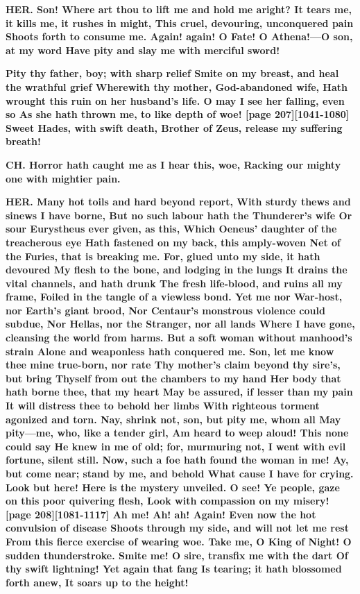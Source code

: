 \documentclass[11pt,letter]{book}
\begin{document}
\par \textbf{HER. Son! Where art thou to lift me and hold me aright? It tears me, it kills me, it rushes in might, This cruel, devouring, unconquered pain Shoots forth to consume me. Again! again! O Fate! O Athena!—O son, at my word Have pity and slay me with merciful sword!}
\par 

\par \textbf{Pity thy father, boy; with sharp relief Smite on my breast, and heal the wrathful grief Wherewith thy mother, God-abandoned wife, Hath wrought this ruin on her husband’s life. O may I see her falling, even so As she hath thrown me, to like depth of woe! [page 207][1041-1080] Sweet Hades, with swift death, Brother of Zeus, release my suffering breath!}
\par 

\par \textbf{CH. Horror hath caught me as I hear this, woe, Racking our mighty one with mightier pain.}
\par 

\par \textbf{HER. Many hot toils and hard beyond report, With sturdy thews and sinews I have borne, But no such labour hath the Thunderer’s wife Or sour Eurystheus ever given, as this, Which Oeneus’ daughter of the treacherous eye Hath fastened on my back, this amply-woven Net of the Furies, that is breaking me. For, glued unto my side, it hath devoured My flesh to the bone, and lodging in the lungs It drains the vital channels, and hath drunk The fresh life-blood, and ruins all my frame, Foiled in the tangle of a viewless bond. Yet me nor War-host, nor Earth’s giant brood, Nor Centaur’s monstrous violence could subdue, Nor Hellas, nor the Stranger, nor all lands Where I have gone, cleansing the world from harms. But a soft woman without manhood’s strain Alone and weaponless hath conquered me. Son, let me know thee mine true-born, nor rate Thy mother’s claim beyond thy sire’s, but bring Thyself from out the chambers to my hand Her body that hath borne thee, that my heart May be assured, if lesser than my pain It will distress thee to behold her limbs With righteous torment agonized and torn. Nay, shrink not, son, but pity me, whom all May pity—me, who, like a tender girl, Am heard to weep aloud! This none could say He knew in me of old; for, murmuring not, I went with evil fortune, silent still. Now, such a foe hath found the woman in me! Ay, but come near; stand by me, and behold What cause I have for crying. Look but here! Here is the mystery unveiled. O see! Ye people, gaze on this poor quivering flesh, Look with compassion on my misery! [page 208][1081-1117] Ah me! Ah! ah! Again! Even now the hot convulsion of disease Shoots through my side, and will not let me rest From this fierce exercise of wearing woe. Take me, O King of Night! O sudden thunderstroke. Smite me! O sire, transfix me with the dart Of thy swift lightning! Yet again that fang Is tearing; it hath blossomed forth anew, It soars up to the height!}
\par 
\end{document}
